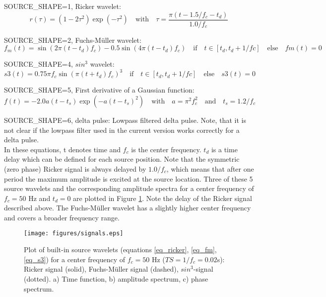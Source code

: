 SOURCE\_SHAPE=1, Ricker wavelet:
\begin{equation}
r(\tau)=\left(1-2\tau^2\right)\exp(-\tau^2) \quad \mbox{with} \quad \tau=\frac{\pi(t-1.5/f_c-t_d)}{1.0/f_c}
\label{eq_ricker}
\end{equation}

SOURCE\_SHAPE=2, Fuchs-M\"uller wavelet:
\begin{equation}
f_m(t)=\sin(2\pi(t-t_d)f_c)-0.5\sin(4\pi(t-t_d)f_c) \quad \mbox{if} \quad t\in[t_d,t_d+1/fc] \quad \mbox{else} \quad fm(t)=0
\label{eq_fm}
\end{equation}

SOURCE\_SHAPE=4, $sin^3$ wavelet:
\begin{equation}
s3(t)=0.75 \pi f_c \sin(\pi(t+t_d)f_c)^3\quad \mbox{if} \quad t \in[t_d,t_d+1/fc] \quad \mbox{else} \quad s3(t)=0
\label{eq_s3}
\end{equation}

SOURCE\_SHAPE=5, First derivative of a Gaussian function:
\begin{equation}
f(t)= -2.0 a (t-t_s) \exp(-a (t-t_s)^2)\quad \mbox{with} \quad a=\pi^2 f_c^2 \quad \mbox{and} \quad t_s=1.2/f_c
\label{eq_deriv_of_gaussian}
\end{equation}

SOURCE\_SHAPE=6, delta pulse: Lowpass filtered delta pulse. Note, that it is not clear if the lowpass filter used in the current version works correctly for a delta pulse.\\


In these equations, t denotes time and $f_c$ is the center frequency. $t_d$ is a time delay which can be defined for each source position. Note that the symmetric (zero phase) Ricker signal is always delayed by $1.0/f_c$, which means that after one period the maximum amplitude is excited at the source location. Three of these 5 source wavelets and the corresponding amplitude spectra for a center frequency of $f_c=50$ Hz and $t_d=0$ are plotted in Figure \ref{fig_source_wavelets_json}. Note the delay of the Ricker signal described above. The Fuchs-M\"uller wavelet has a slightly higher center frequency and covers a broader frequency range.
\newline

\begin{figure}
\begin{center}
\texttt{[image: figures/signals.eps]}
\end{center}
\caption{Plot of built-in source wavelets (equations \ref{eq_ricker}, \ref{eq_fm}, \ref{eq_s3}) for a center frequency of $f_c=50$ Hz 
($TS=1/f_c=0.02$s): Ricker signal (solid), Fuchs-M\"uller signal (dashed), $sin^3$-signal (dotted). a) Time function, b) amplitude
spectrum, c) phase spectrum.  }
\label{fig_source_wavelets_json}
\end{figure}

